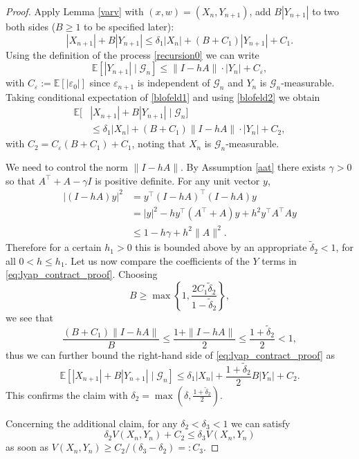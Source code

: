 \documentclass[10pt,a4paper]{amsart}
\def\mE{\mathbb{E}}
\begin{document}
\begin{proof}
  Apply Lemma \ref{varv} with $(x,w)=(X_n,Y_{n+1})$, add $B|Y_{n+1}|$ to two both sides ($B\geq 1$ to be specified later):
\begin{equation}\label{blofeld1}
|X_{n+1}|+B|Y_{n+1}|\leq \delta_1 |X_{n}|+(B+C_1)|Y_{n+1}|+C_1.
\end{equation}
Using the definition of the process \eqref{recursion0} we can write
\begin{equation}\label{blofeld2}
\mE[|Y_{n+1}| \mid \mathcal{G}_{n}] \leq \|I-hA\|\cdot |Y_n| + C_{\varepsilon},
\end{equation}
with $C_{\varepsilon}:=\mE[|\varepsilon_0|]$ since $\varepsilon_{n+1}$ is independent of $\mathcal{G}_{n}$ and $Y_{n}$
is $\mathcal{G}_{n}$-measurable.
%
Taking conditional expectation of \eqref{blofeld1} and using \eqref{blofeld2} we obtain
\begin{equation}
  \label{eq:lyap_contract_proof}
  \begin{aligned}
    \mE[&|X_{n+1}|+B|Y_{n+1}|\mid\mathcal{G}_{n}]\\
    &\leq \delta_1 |X_{n}|+(B+C_1)\|I-hA\|\cdot |Y_n|+C_2,
  \end{aligned}    
\end{equation}
with $C_2 = C_{\varepsilon}(B+C_1)+C_1$, noting that $X_{n}$ is $\mathcal{G}_{n}$-measurable.

We need to control the norm $\|I-hA\|$.
By Assumption \ref{aat} there exists $\gamma>0$ so that $A^\top+A-\gamma I$ is positive definite. For any unit vector $y$,
\begin{align*}
|(I-hA)y|^2&= y^\top(I-hA)^\top(I-hA)y\\
&=|y|^2-hy^\top(A^\top+A)y+h^2y^\top A^\top A y\\
&\leq 1 - h\gamma +h^2\|A\|^2.  
\end{align*}
Therefore for a certain $h_1>0$ this is bounded above by an appropriate $\tilde\delta_2<1$,
for all $0<h\leq h_1$.
Let us now compare the coefficients of the $Y$ terms in \eqref{eq:lyap_contract_proof}.
Choosing $$B\geq \max\left\{1,\frac{2C_{1}\tilde{\delta}_{2}}{1-\tilde{\delta}_{2}}\right\},$$
we see that 
\[
\frac{(B+C_1)\|I-hA\|}{B}\leq \frac{1+\|I-hA\|}{2}\leq\frac{1+\tilde\delta_2}{2}<1,
\]
thus we can further bound the right-hand side of \eqref{eq:lyap_contract_proof} as
\begin{equation*}
    \mE[|X_{n+1}|+B|Y_{n+1}|\mid\mathcal{G}_{n}]\leq \delta_1 |X_{n}|+\frac{1+\tilde\delta_2}{2}B |Y_n|+C_2.
\end{equation*}
This confirms the claim with $\delta_2 = \max(\delta,\frac{1+\tilde\delta_2}{2})$.

Concerning the additional claim, for any $\delta_2<\delta_3<1$ we can satisfy 
$$\delta_2 V(X_{n},Y_{n})+C_2\leq \delta_3 
V(X_{n},Y_{n})$$ 
as soon as $V(X_{n},Y_{n})\geq C_2/(\delta_3-\delta_2)=:C_{3}$.
\end{proof}
\end{document}
